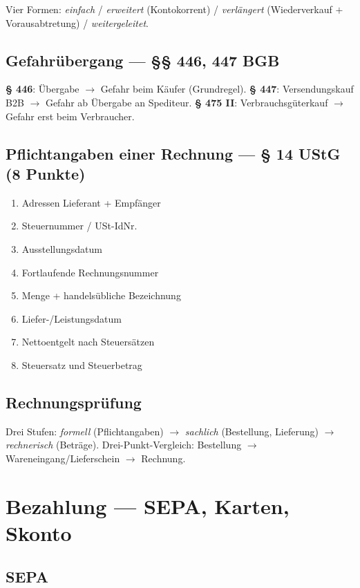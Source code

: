 \documentclass[11pt, a4paper]{article}
\begin{document}
Vier Formen: \emph{einfach} / \emph{erweitert} (Kontokorrent) / \emph{verlängert}
(Wiederverkauf $+$ Vorausabtretung) / \emph{weitergeleitet}.

\subsection{Gefahrübergang --- §§ 446, 447 BGB}

\textbf{§ 446}: Übergabe $\to$ Gefahr beim Käufer (Grundregel).
\textbf{§ 447}: Versendungskauf B2B $\to$ Gefahr ab Übergabe an Spediteur.
\textbf{§ 475 II}: Verbrauchsgüterkauf $\to$ Gefahr erst beim Verbraucher.

\subsection{Pflichtangaben einer Rechnung --- § 14 UStG (8 Punkte)}

\begin{enumerate}[itemsep=0pt]
  \item Adressen Lieferant + Empfänger
  \item Steuernummer / USt-IdNr.
  \item Ausstellungsdatum
  \item Fortlaufende Rechnungsnummer
  \item Menge + handelsübliche Bezeichnung
  \item Liefer-/Leistungsdatum
  \item Nettoentgelt nach Steuersätzen
  \item Steuersatz und Steuerbetrag
\end{enumerate}

\subsection{Rechnungsprüfung}

Drei Stufen: \emph{formell} (Pflichtangaben) $\to$ \emph{sachlich} (Bestellung,
Lieferung) $\to$ \emph{rechnerisch} (Beträge). Drei-Punkt-Vergleich:
Bestellung $\to$ Wareneingang/Lieferschein $\to$ Rechnung.

\section{Bezahlung --- SEPA, Karten, Skonto}

\subsection{SEPA}
\end{document}
